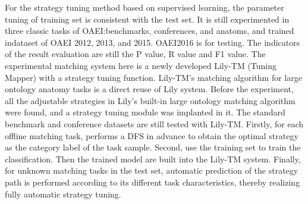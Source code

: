 \documentclass[twoside]{article}
\makeatletter
\def\subsubsection{\@startsection{subsubsection}{3}{\z@}%
 {-2.2ex\@plus -.21ex \@minus -.2ex}%
 {1.4ex \@plus.2ex}
{\normalfont\normalsize\protect\baselineskip=12pt plus.2pt minus.2pt\sl}}
\makeatother
\begin{document}
For the strategy tuning method based on supervised learning, the parameter tuning of training set is consistent with the test set. It is still experimented in three classic tasks of OAEI:benchmarks, conferences, and anatoms, and trained indataset of OAEI 2012, 2013, and 2015. OAEI2016 is for testing.
The indicators of the result evaluation are still the P value, R value and F1 value.
The experimental matching system here is a newly developed Lily-TM (Tuning Mapper) with a strategy tuning function.
Lily-TM's matching algorithm for large ontology anatomy tasks is a direct reuse of Lily system. Before the experiment, all the adjustable strategies in Lily's built-in large ontology matching algorithm were found, and a strategy tuning module was implanted in it.
The standard benchmark and conference datasets are still tested with Lily-TM.
Firstly, for each offline matching task, performs a DFS in advance to obtain the optimal strategy as the category label of the task sample. Second, use the training set to train the classification. Then the trained model are built into the Lily-TM system. Finally, for unknown matching tasks in the test set, automatic prediction of the strategy path is performed according to its different task characteristics, thereby realizing fully automatic strategy tuning.

\end{document}
